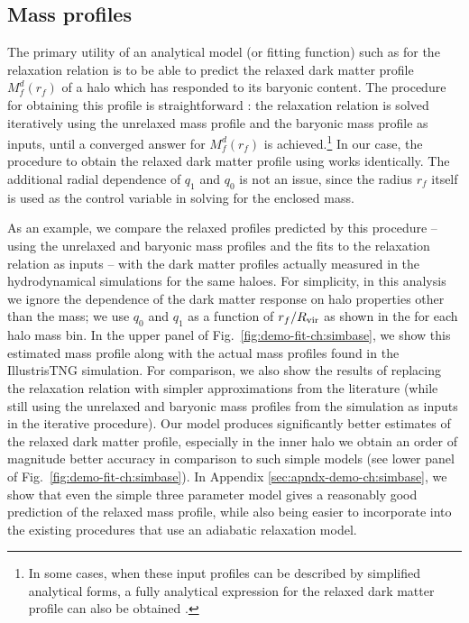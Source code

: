 \subsection{Mass profiles}
\label{sec:mass-prof-demo-ch:simbase}
The primary utility of an analytical model (or fitting function) such as  for the relaxation relation is to be able to predict the relaxed dark matter profile $M_f^d(r_f)$ of a halo which has responded to its baryonic content. The procedure for obtaining this profile is straightforward \citep[see, e.g., Appendix A of][]{2021MNRAS.503.4147P}: the relaxation relation is solved iteratively using the unrelaxed mass profile and the baryonic mass profile as inputs, until a converged answer for $M_f^d(r_f)$ is achieved.\footnote{In some cases, when these input profiles can be described by simplified analytical forms, a fully analytical expression for the relaxed dark matter profile can also be obtained \citep[see, e.g., Appendix A of][]{2021MNRAS.507..632P}.} In our case, the procedure to obtain the relaxed dark matter profile using  works identically. The additional radial dependence of $q_1$ and $q_0$ is not an issue, since the radius $r_f$ itself is used as the control variable in solving for the enclosed mass.


As an example, we compare the relaxed profiles predicted by this procedure -- using the unrelaxed and baryonic mass profiles and the fits to the relaxation relation  as inputs -- with the dark matter profiles actually measured in the hydrodynamical simulations for the same haloes.
For simplicity, in this analysis we ignore the dependence of the dark matter response on halo properties other than the mass;
we use $q_0$ and $q_1$ as a function of $r_f/R_{\rm{vir}}$ as shown in the  for each halo mass bin. In the upper panel of Fig.~\ref{fig:demo-fit-ch:simbase}, we show this estimated mass profile along with the actual mass profiles found in the IllustrisTNG simulation.
For comparison, we also show the results of replacing the relaxation relation with simpler approximations from the literature (while still using the unrelaxed and baryonic mass profiles from the simulation as inputs in the iterative procedure).
Our model produces significantly better estimates of the relaxed dark matter profile, especially in the inner halo we obtain an order of magnitude better accuracy in comparison to such simple models (see lower panel of Fig.~\ref{fig:demo-fit-ch:simbase}). In Appendix \ref{sec:apndx-demo-ch:simbase}, we show that even the simple three parameter model gives a reasonably good prediction of the relaxed mass profile, while also being easier to incorporate into the existing procedures that use an adiabatic relaxation model. 


